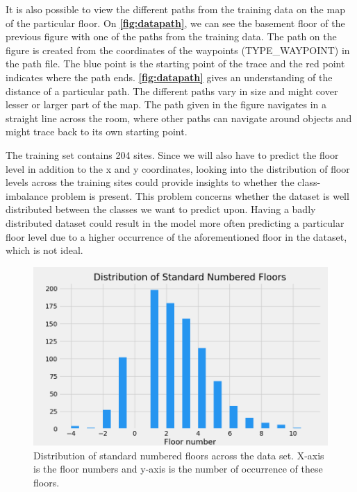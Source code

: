 It is also possible to view the different paths from the training data on the map of the particular floor. On \textbf{\autoref{fig:datapath}}, we can see the basement floor of the previous figure with one of the paths from the training data. The path on the figure is created from the coordinates of the waypoints (TYPE\_WAYPOINT) in the path file. The blue point is the starting point of the trace and the red point indicates where the path ends. \textbf{\autoref{fig:datapath}} gives an understanding of the distance of a particular path. The different paths vary in size and might cover lesser or larger part of the map. The path given in the figure navigates in a straight line across the room, where other paths can navigate around objects and might trace back to its own starting point.

The training set contains 204 sites. Since we will also have to predict the floor level in addition to the x and y coordinates, looking into the distribution of floor levels across the training sites could provide insights to whether the class-imbalance problem is present. This problem concerns whether the dataset is well distributed between the classes we want to predict upon. Having a badly distributed dataset could result in the model more often predicting a particular floor level due to a higher occurrence of the aforementioned floor in the dataset, which is not ideal.\cite[377-378]{Han_Kamber_2012}

\begin{figure}[H]
    \centering
    \includegraphics[scale=.5]{Images/ProblemAnalysis/datadistribution6.png}
    \caption{Distribution of standard numbered floors across the data set. X-axis is the floor numbers and y-axis is the number of occurrence of these floors.}
    \label{fig:datadistribution}
\end{figure}

